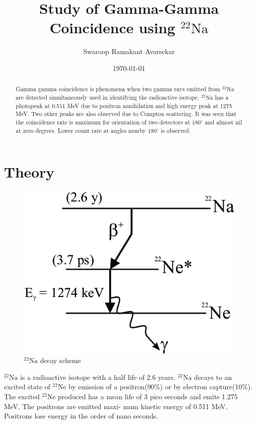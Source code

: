 \documentclass[a4paper, amsfonts, amssymb, amsmath, reprint, showkeys, nofootinbib, twoside]{revtex4-1}
\begin{document}
\title{Study of Gamma-Gamma Coincidence using $^{22}\text{Na}$}
\author{Swaroop Ramakant Avarsekar}
\date{\today}

\begin{abstract}
Gamma gamma coincidence is phenomena when two gamma rays emitted from $^{22}\text{Na}$ are detected simultaneously used in identifying the radioactive isotope. $^{22}\text{Na}$ has a photopeak at 0.511 MeV due to positron annihilation and high energy peak at 1275 MeV. Two other peaks are also observed due to Compton scattering. It was seen that the coincidence rate is maximum for orientation of two detectors at $180^{\circ}$ and almost nil at zero degrees. Lower count rate at angles nearby $180^{\circ}$ is observed.
\end{abstract}

\maketitle
\section{Theory}
\begin{figure}[H]
	\centering
	\includegraphics[scale=0.4]{1} 
	\caption{$^{22}\text{Na}$ decay scheme}
	\label{s}
\end{figure}

$^{22}\text{Na}$ is a radioactive isotope with a half life of 2.6 years. $^{22}\text{Na}$ decays to an excited state of $^{22}\text{Ne}$ by emission of a positron(90\%) or by electron capture(10\%). The excited $^{22}\text{Ne}$ produced has a mean life of 3 pico seconds
and emits 1.275 MeV. The positrons are emitted maxi- mum kinetic energy of 0.511 MeV. Positrons lose energy in the order of nano seconds.
\end{document}
